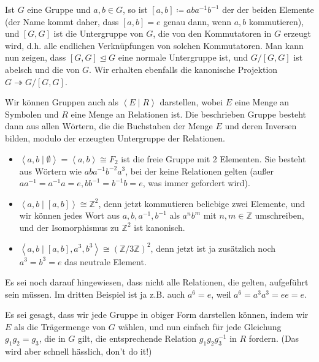 \begin{recap}
    Ist $G$ eine Gruppe und  $a,b\in G$, so ist $[a,b] \coloneqq  aba^{-1}b^{-1}$ der  der beiden Elemente (der Name kommt daher, dass $[a,b] = e$ genau dann, wenn  $a,b$ kommutieren), und  $[G,G]$ ist die Untergruppe von  $G$, die von den Kommutatoren in $G$ erzeugt wird, d.h. alle endlichen Verknüpfungen von solchen Kommutatoren. Man kann nun zeigen, dass $[G,G]\unlhd G$ eine normale Untergruppe ist, und  $G / [G,G]$ ist abelsch und die   von $G$. Wir erhalten ebenfalls die kanonische Projektion $G \twoheadrightarrow G / [G,G]$.
\end{recap}

\begin{recap}
Wir können Gruppen auch als $\left< E \mid  R \right> $ darstellen, wobei $E$ eine Menge an Symbolen und  $R$ eine Menge an Relationen ist. Die beschrieben Gruppe besteht dann aus allen Wörtern, die die Buchstaben der Menge  $E$ und deren Inversen bilden, modulo der erzeugten Untergruppe der Relationen. \\
\begin{itemize}
    \item $\left< a,b \mid \emptyset \right>  = \left< a,b \right>  \cong F_2$ ist die freie Gruppe mit 2 Elementen. Sie besteht aus Wörtern wie $aba^{-1}b^{-2}a^3$, bei der keine Relationen gelten (außer $a a^{-1} = a^{-1}a = e, b b^{-1} = b^{-1} b = e$, was immer gefordert  wird).
    \item $\left< a,b \mid  [a,b] \right> \cong \mathbb{Z}^2$, denn jetzt kommutieren beliebige zwei Elemente, und wir können jedes Wort aus  $a,b,a^{-1},b^{-1}$ als $a^nb^m$ mit  $n,m \in \mathbb{Z}$ umschreiben, und der Isomorphismus zu $\mathbb{Z}^2$ ist kanonisch.
    \item $\left< a,b \mid  [a,b], a^3, b^3 \right> \cong \left( \mathbb{Z} / 3\mathbb{Z} \right) ^2$, denn jetzt ist ja zusätzlich noch $a^3 = b^3 = e$ das neutrale Element.
\end{itemize}
\end{recap}

\begin{oral}
\Warning    Es sei noch darauf hingewiesen, dass nicht alle Relationen, die gelten, aufgeführt sein müssen. Im dritten Beispiel ist ja z.B. auch $a^6 = e$, weil  $a^6 = a^3 a^3 = e e = e$.
\end{oral}
\begin{remark*}
Es sei gesagt, dass wir jede Gruppe in obiger Form darstellen können, indem wir $E$ als die Trägermenge von  $G$ wählen, und nun einfach für jede Gleichung  $g_1g_2 = g_3$, die in $G$ gilt, die entsprechende Relation  $g_1g_2g_3^{-1}$ in $R$ fordern. (Das wird aber schnell hässlich, don't do it!)
\end{remark*}

